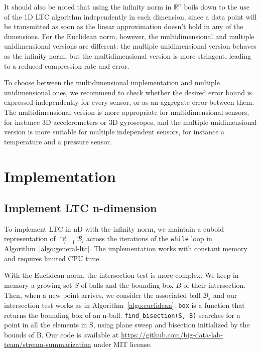\documentclass{report}
\begin{document}
It should also be noted that using the infinity norm in $\mathbb{R}^n$ 
boils down to the use of the 1D LTC algorithm independently in each 
dimension, since a data point will be transmitted as soon as the linear 
approximation doesn't hold in any of the dimensions. For the Euclidean 
norm, however, the multidimensional and multiple unidimensional 
versions are different: the multiple unidimensional version 
behaves as the infinity norm, but the multidimensional version is more 
stringent, leading to a reduced compression rate and error.

To choose between the multidimensional implementation and multiple 
unidimensional ones, we recommend to check whether the desired 
error bound is expressed independently for every sensor, or as an aggregate error between them.
The multidimensional version is
more appropriate for multidimensional sensors, for instance 3D 
accelerometers or 3D gyroscopes, and the multiple unidimensional 
version is more suitable for multiple independent sensors, for 
instance a temperature and a pressure sensor.

\chapter{Implementation}
\section{Implement LTC n-dimension}
To implement LTC in nD with the infinity norm, we maintain a cuboid 
representation of $\cap_{l=1}^j{\mathcal{B}_l}$ across the 
iterations of the \texttt{while} loop in 
Algorithm~\ref{algo:general-ltc}. The implementation works with
constant memory and requires limited CPU time.

With the Euclidean norm, the intersection test is more complex. We keep 
in memory a growing set $S$ of balls and the bounding box $B$ of their 
intersection. Then, when a new point arrives, we consider the 
associated ball $\mathcal{B}_j$ and our intersection test works as in 
Algorithm~\ref{algo:euclidean}. \texttt{box} is a function that returns 
the bounding box of an n-ball. \texttt{find\_bisection(S, B)} searches 
for a point in all the elements in S, using plane sweep and bisection 
initialized by the bounds of B. Our code is available at 
\url{https://github.com/big-data-lab-team/stream-summarization} under 
MIT license.
\end{document}
